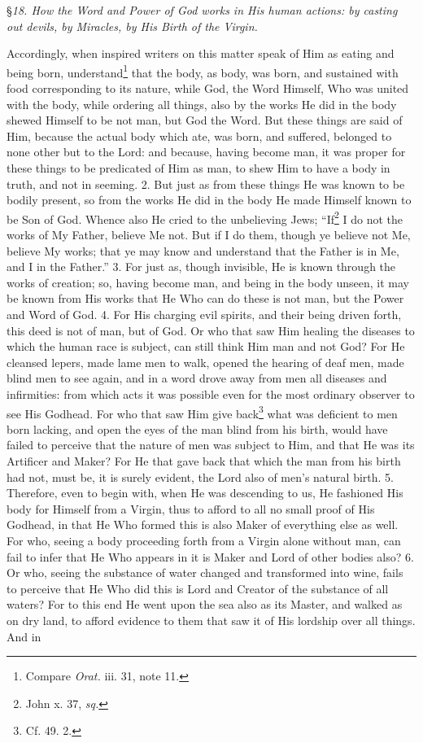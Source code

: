 
§\emph{18. How the Word and Power of God works in His human actions: by casting out devils, by Miracles, by His Birth of the Virgin.}

Accordingly, when inspired writers on this matter speak of Him as eating and being born, understand\footnote{Compare \emph{Orat.} iii. 31, note 11.} that the body, as body, was born, and sustained with food corresponding to its nature, while God, the Word Himself, Who was united with the body, while ordering all things, also by the works He did in the body shewed Himself to be not man, but God the Word. But these things are said of Him, because the actual body which ate, was born, and suffered, belonged to none other but to the Lord: and because, having become man, it was proper for these things to be predicated of Him as man, to shew Him to have a body in truth, and not in seeming. 2. But just as from these things He was known to be bodily present, so from the works He did in the body He made Himself known to be Son of God. Whence also He cried to the unbelieving Jews; “If\footnote{John x. 37, \emph{sq.}} I do not the works of My Father, believe Me not. But if I do them, though ye believe not Me, believe My works; that ye may know and understand that the Father is in Me, and I in the Father.” 3. For just as, though invisible, He is known through the works of creation; so, having become man, and being in the body unseen, it may be known from His works that He Who can do these is not man, but the Power and Word of God. 4. For His charging evil spirits, and their being driven forth, this deed is not of man, but of God. Or who that saw Him healing the diseases to which the human race is subject, can still think Him man and not God? For He cleansed lepers, made lame men to walk, opened the hearing of deaf men, made blind men to see again, and in a word drove away from men all diseases and infirmities: from which acts it was possible even for the most ordinary observer to see His Godhead. For who that saw Him give back\footnote{Cf. 49. 2.} what was deficient to men born lacking, and open the eyes of the man blind from his birth, would have failed to perceive that the nature of men was subject to Him, and that He was its Artificer and Maker? For He that gave back that which the man from his birth had not, must be, it is surely evident, the Lord also of men’s natural birth. 5. Therefore, even to begin with, when He was descending to us, He fashioned His body for Himself from a Virgin, thus to afford to all no small proof of His Godhead, in that He Who formed this is also Maker of everything else as well. For who, seeing a body proceeding forth from a Virgin alone without man, can fail to infer that He Who appears in it is Maker and Lord of other bodies also? 6. Or who, seeing the substance of water changed and transformed into wine, fails to perceive that He Who did this is Lord and Creator of the substance of all waters? For to this end He went upon the sea also as its Master, and walked as on dry land, to afford evidence to them that saw it of His lordship over all things. And in 